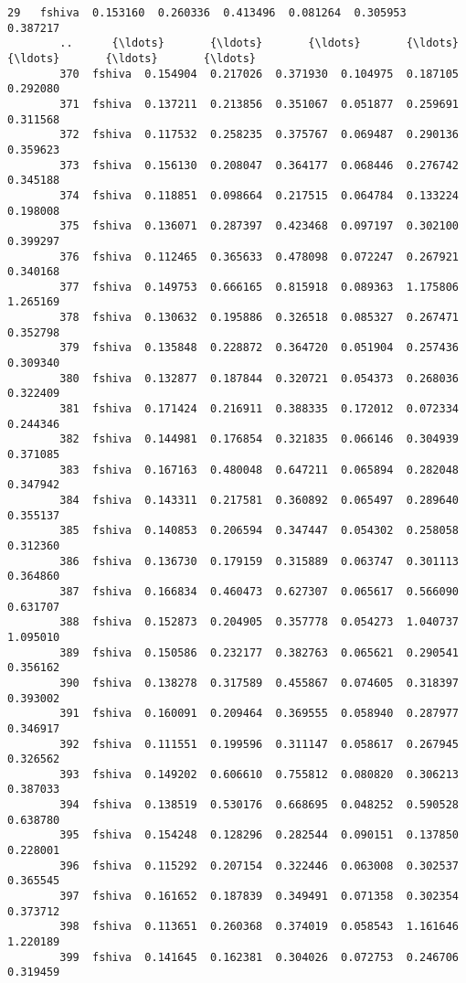 \documentclass[11pt]{article}
\begin{document}
\begin{Verbatim}[commandchars=\\\{\}]
        29   fshiva  0.153160  0.260336  0.413496  0.081264  0.305953  0.387217   
        ..      {\ldots}       {\ldots}       {\ldots}       {\ldots}       {\ldots}       {\ldots}       {\ldots}   
        370  fshiva  0.154904  0.217026  0.371930  0.104975  0.187105  0.292080   
        371  fshiva  0.137211  0.213856  0.351067  0.051877  0.259691  0.311568   
        372  fshiva  0.117532  0.258235  0.375767  0.069487  0.290136  0.359623   
        373  fshiva  0.156130  0.208047  0.364177  0.068446  0.276742  0.345188   
        374  fshiva  0.118851  0.098664  0.217515  0.064784  0.133224  0.198008   
        375  fshiva  0.136071  0.287397  0.423468  0.097197  0.302100  0.399297   
        376  fshiva  0.112465  0.365633  0.478098  0.072247  0.267921  0.340168   
        377  fshiva  0.149753  0.666165  0.815918  0.089363  1.175806  1.265169   
        378  fshiva  0.130632  0.195886  0.326518  0.085327  0.267471  0.352798   
        379  fshiva  0.135848  0.228872  0.364720  0.051904  0.257436  0.309340   
        380  fshiva  0.132877  0.187844  0.320721  0.054373  0.268036  0.322409   
        381  fshiva  0.171424  0.216911  0.388335  0.172012  0.072334  0.244346   
        382  fshiva  0.144981  0.176854  0.321835  0.066146  0.304939  0.371085   
        383  fshiva  0.167163  0.480048  0.647211  0.065894  0.282048  0.347942   
        384  fshiva  0.143311  0.217581  0.360892  0.065497  0.289640  0.355137   
        385  fshiva  0.140853  0.206594  0.347447  0.054302  0.258058  0.312360   
        386  fshiva  0.136730  0.179159  0.315889  0.063747  0.301113  0.364860   
        387  fshiva  0.166834  0.460473  0.627307  0.065617  0.566090  0.631707   
        388  fshiva  0.152873  0.204905  0.357778  0.054273  1.040737  1.095010   
        389  fshiva  0.150586  0.232177  0.382763  0.065621  0.290541  0.356162   
        390  fshiva  0.138278  0.317589  0.455867  0.074605  0.318397  0.393002   
        391  fshiva  0.160091  0.209464  0.369555  0.058940  0.287977  0.346917   
        392  fshiva  0.111551  0.199596  0.311147  0.058617  0.267945  0.326562   
        393  fshiva  0.149202  0.606610  0.755812  0.080820  0.306213  0.387033   
        394  fshiva  0.138519  0.530176  0.668695  0.048252  0.590528  0.638780   
        395  fshiva  0.154248  0.128296  0.282544  0.090151  0.137850  0.228001   
        396  fshiva  0.115292  0.207154  0.322446  0.063008  0.302537  0.365545   
        397  fshiva  0.161652  0.187839  0.349491  0.071358  0.302354  0.373712   
        398  fshiva  0.113651  0.260368  0.374019  0.058543  1.161646  1.220189   
        399  fshiva  0.141645  0.162381  0.304026  0.072753  0.246706  0.319459   
        

\end{Verbatim}
\end{document}
